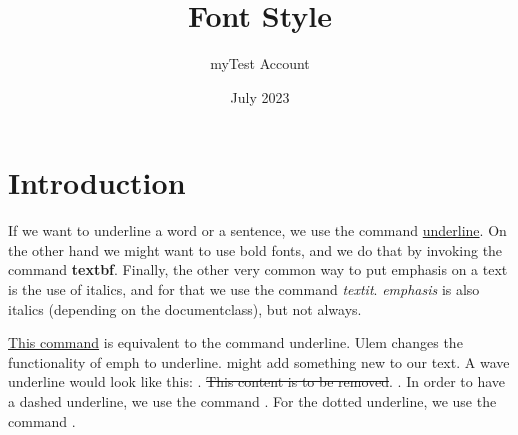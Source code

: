 \documentclass{article}
\title{Font Style}
\author{myTest Account}
\date{July 2023}
\begin{document}
\maketitle

\section{Introduction}

If we want to underline a word or a sentence, we use the command \underline{underline}. On the other hand we might want to use bold fonts, and we do that by invoking the command \textbf{textbf}. Finally, the other very common way to put emphasis on a text is the use of italics, and for that we use the command \textit{textit}. \emph{emphasis} is also italics (depending on the documentclass), but not always.

\uline{This command} is equivalent to the command underline. Ulem changes the functionality of emph to underline.  might add something new to our text. A wave underline would look like this: . \sout{This content is to be removed}. . In order to have a dashed underline, we use the command . For the dotted underline, we use the command .
\end{document}
